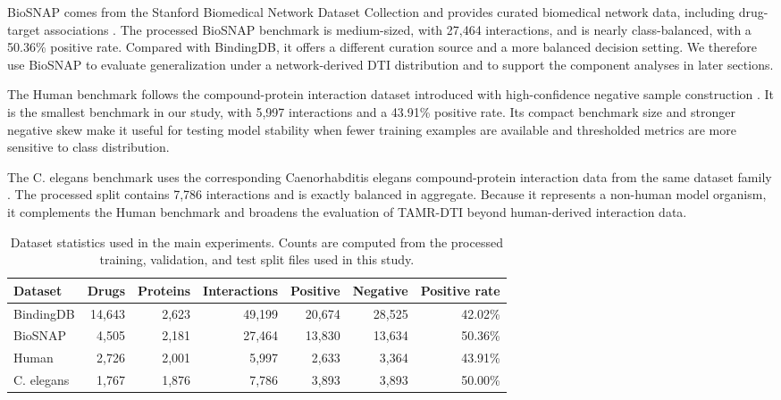 BioSNAP comes from the Stanford Biomedical Network Dataset Collection and provides curated biomedical network data, including drug-target associations \citep{biosnapnets}. The processed BioSNAP benchmark is medium-sized, with 27,464 interactions, and is nearly class-balanced, with a 50.36\% positive rate. Compared with BindingDB, it offers a different curation source and a more balanced decision setting. We therefore use BioSNAP to evaluate generalization under a network-derived DTI distribution and to support the component analyses in later sections.

The Human benchmark follows the compound-protein interaction dataset introduced with high-confidence negative sample construction \citep{liu2015credible}. It is the smallest benchmark in our study, with 5,997 interactions and a 43.91\% positive rate. Its compact benchmark size and stronger negative skew make it useful for testing model stability when fewer training examples are available and thresholded metrics are more sensitive to class distribution.

The C. elegans benchmark uses the corresponding Caenorhabditis elegans compound-protein interaction data from the same dataset family \citep{liu2015credible}. The processed split contains 7,786 interactions and is exactly balanced in aggregate. Because it represents a non-human model organism, it complements the Human benchmark and broadens the evaluation of TAMR-DTI beyond human-derived interaction data.

\begin{table}[!htbp]
\caption{Dataset statistics used in the main experiments. Counts are computed from the processed training, validation, and test split files used in this study.}
\label{tab:dataset_overview}
\begin{center}
\begin{tabular}{lrrrrrr}
\toprule
Dataset & Drugs & Proteins & Interactions & Positive & Negative & Positive rate \\
\midrule
BindingDB & 14,643 & 2,623 & 49,199 & 20,674 & 28,525 & 42.02\% \\
BioSNAP & 4,505 & 2,181 & 27,464 & 13,830 & 13,634 & 50.36\% \\
Human & 2,726 & 2,001 & 5,997 & 2,633 & 3,364 & 43.91\% \\
C. elegans & 1,767 & 1,876 & 7,786 & 3,893 & 3,893 & 50.00\% \\
\bottomrule
\end{tabular}
\end{center}
\end{table}


